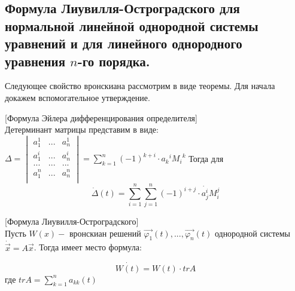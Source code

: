 \subsection{Формула Лиувилля-Остроградского для нормальной линейной однородной системы уравнений и для линейного однородного уравнения $n$-го порядка.}

Следующее свойство вронскиана рассмотрим в виде теоремы. Для начала докажем вспомогательное утверждение.

\begin{lemma}

[Формула Эйлера дифференцирования определителя]\\
Детерминант матрицы представим в виде: 
$\Delta = 
\begin{vmatrix}
  a_1^1 & ... & a_n^1 \\
  a_1^i & ... & a_n^i \\
  ...   & ... & ...   \\
  a_1^n & ... & a_n^n \\
\end{vmatrix} = \sum\limits_{k = 1}^n{(-1)^{k + i} \cdot {a_k}^i {M_i}^k}
$
Тогда для 
\[\dot{\Delta}(t) = \sum\limits_{i = 1}^n{\sum\limits_{j = 1}^n{(-1)^{i + j} \cdot \dot{a_j^i}}M_i^j}\]

\end{lemma}

\begin{theorem}

[Формула Лиувилля-Остроградского]\\
Пусть $W(x) - $ вронскиан решений $\vec{\varphi_1}(t), ..., \vec{\varphi_n}(t)$ однородной системы $\dot{\vec{x}} = A\vec{x}$. Тогда имеет место формула:

\[\dot{W(t)} = W(t) \cdot trA\]
где $trA = \sum\limits_{k = 1}^n{a_{kk}(t)}$

\end{theorem}

